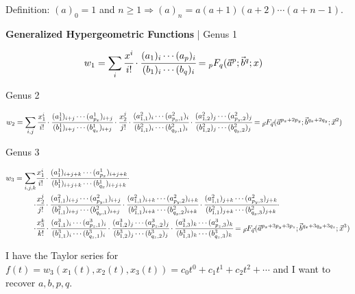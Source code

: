 \documentclass[12pt]{article}
\begin{document}
Definition: $(a)_0 = 1$ and $n \ge 1 \Rightarrow (a)_n = a(a+1)(a+2)\cdots (a+n-1)$.

\vspace{5mm}

\large

\textbf{Generalized Hypergeometric Functions} | Genus 1

\Large

\begin{align}
w_1 &= \sum_i \cfrac{x^i}{i!} \cdot \cfrac{(a_1)_i \cdots (a_p)_i}{(b_1)_i \cdots (b_q)_i} = {}_p F _q(\vec a^p; \vec b^q; x)
\end{align}

\normalsize

Genus 2

\begin{align}
w_2 &= \sum_{i,j} \cfrac{x_1^i}{i!} \cdot \cfrac{(a_1^1)_{i+j} \cdots (a_{p_x}^1)_{i+j}}{(b_1^1)_{i+j} \cdots (b_{q_x}^1)_{i+j}} \cdot \cfrac{x_2^j}{j!} \cdot \cfrac{(a_{1,1}^2)_i \cdots (a_{{p_y},1}^2)_i}{(b_{1,1}^2)_i \cdots (b_{{q_y},1}^2)_i} \cdot \cfrac{(a_{1,2}^2)_j \cdots (a_{{p_y},2}^2)_j}{(b_{1,2}^2)_j \cdots (b_{{q_y},2}^2)_j} = {}_{\vec p} F _{\vec q}(\vec a^{p_x + 2 p_y}; \vec b^{q_x + 2 q_y}; \vec x^2)
\end{align}

Genus 3

\begin{align}
w_3 = \sum_{i,j,k} &\cfrac{x_1^i}{i!} \cdot \cfrac{(a_1^1)_{i+j+k} \cdots (a_{p_x}^1)_{i+j+k}}{(b_1^1)_{i+j+k} \cdots (b_{q_x}^1)_{i+j+k}} \cdot \\
    \cdot &\cfrac{x_2^j}{j!} \cdot \cfrac{(a_{1,1}^2)_{i+j} \cdots (a_{p_y,1}^2)_{i+j}}{(b_{1,1}^2)_{i+j} \cdots (b_{q_y,1}^2)_{i+j}}\cdot \cfrac{(a_{1,1}^2)_{i+k} \cdots (a_{p_y,2}^2)_{i+k}}{(b_{1,1}^2)_{i+k} \cdots (b_{q_y,2}^2)_{i+k}}\cdot \cfrac{(a_{1,1}^2)_{j+k} \cdots (a_{p_y,3}^2)_{j+k}}{(b_{1,1}^2)_{j+k} \cdots (b_{q_y,3}^2)_{j+k}} \cdot \\
    \cdot &\cfrac{x_3^k}{k!} \cdot \cfrac{(a_{1,1}^3)_i \cdots (a_{{p_z},1}^3)_i}{(b_{1,1}^3)_i \cdots (b_{{q_z},1}^3)_i} \cdot \cfrac{(a_{1,2}^3)_j \cdots (a_{{p_z},2}^3)_j}{(b_{1,2}^3)_j \cdots (b_{{q_z},2}^3)_j} \cdot \cfrac{(a_{1,3}^3)_k \cdots (a_{{p_z},3}^3)_k}{(b_{1,3}^3)_k \cdots (b_{{q_z},3}^3)_k} = {}_{\vec p} F _{\vec q}(\vec a^{p_x + 3 p_y + 3 p_z}; \vec b^{q_x + 3 q_y + 3 q_z}; \vec x^3)
\end{align}

I have the Taylor series for $f(t) = w_3(x_1(t), x_2(t), x_3(t)) = c_0 t^0 + c_1 t^1 + c_2 t^2 + \cdots$ and I want to recover $a,b,p,q$.
\end{document}
